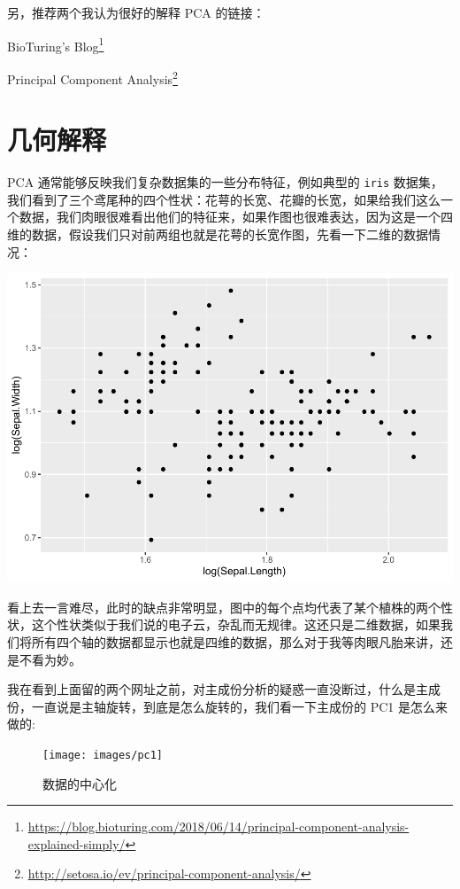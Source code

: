 \documentclass[
]{krantz}
\renewcommand{\href}[2]{#2\footnote{\url{#1}}}
\begin{document}
另，推荐两个我认为很好的解释 PCA 的链接：

\href{https://blog.bioturing.com/2018/06/14/principal-component-analysis-explained-simply/}{BioTuring's Blog}

\href{http://setosa.io/ev/principal-component-analysis/}{Principal Component Analysis}

\hypertarget{geom-pca}{%
\section{几何解释}\label{geom-pca}}

PCA 通常能够反映我们复杂数据集的一些分布特征，例如典型的 \texttt{iris} 数据集，我们看到了三个鸢尾种的四个性状：花萼的长宽、花瓣的长宽，如果给我们这么一个数据，我们肉眼很难看出他们的特征来，如果作图也很难表达，因为这是一个四维的数据，假设我们只对前两组也就是花萼的长宽作图，先看一下二维的数据情况：

\includegraphics{bookdown_files/figure-latex/2dim-1.pdf}

看上去一言难尽，此时的缺点非常明显，图中的每个点均代表了某个植株的两个性状，这个性状类似于我们说的电子云，杂乱而无规律。这还只是二维数据，如果我们将所有四个轴的数据都显示也就是四维的数据，那么对于我等肉眼凡胎来讲，还是不看为妙。

我在看到上面留的两个网址之前，对主成份分析的疑惑一直没断过，什么是主成份，一直说是主轴旋转，到底是怎么旋转的，我们看一下主成份的 PC1 是怎么来做的:

\begin{figure}
\texttt{[image: images/pc1]} \caption{数据的中心化}\label{fig:pccenter}
\end{figure}
\end{document}
